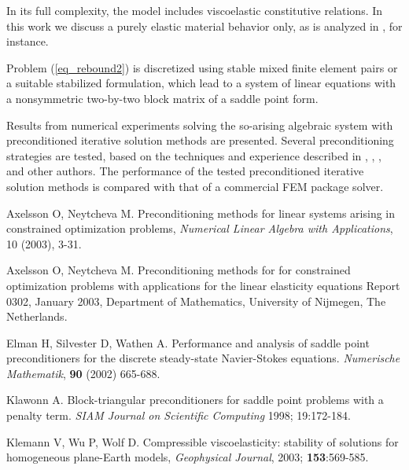 \documentclass{report}
\begin{document}
In its full complexity, the model includes viscoelastic constitutive
relations. In this work we discuss a purely elastic material behavior
only, as is analyzed in \cite{KlemannWuWolf}, for instance.

Problem (\ref{eq_rebound2}) is discretized using stable mixed finite
element pairs or a suitable stabilized formulation,
which lead to a system of linear equations with a nonsymmetric
two-by-two block matrix of a saddle point form.

Results from numerical experiments solving the so-arising algebraic
system with preconditioned iterative solution methods are presented.
Several preconditioning strategies are tested, based on the techniques
and experience described in \cite{Klawonn}, \cite{elman},
\cite{AxelssonNeytcheva}, \cite{AxelssonNeytcheva1} and other authors.
The performance of the tested preconditioned iterative solution methods
is compared with that of a commercial FEM package solver.

\begin{thebibliography}{ABC}
Axelsson O, Neytcheva M.
Preconditioning methods for linear systems arising in constrained optimization problems,
{\em Numerical Linear Algebra with Applications}, 10 (2003), 3-31.

Axelsson O, Neytcheva M.
Preconditioning methods for for constrained optimization problems with
applications for the linear elasticity equations
Report 0302, January 2003, Department of Mathematics,
University of Nijmegen, The Netherlands.

Elman H, Silvester D, Wathen A. Performance and analysis of saddle point
preconditioners for the discrete steady-state Navier-Stokes equations.
\textit{Numerische Mathematik}, {\bf 90} (2002) 665-688.

 Klawonn A. Block-triangular preconditioners for saddle
point problems with a penalty term. {\em SIAM Journal on Scientific
Computing} 1998;
19:172-184.

Klemann V, Wu P, Wolf D. Compressible viscoelasticity: stability of
solutions for homogeneous plane-Earth models,
\textit{Geophysical Journal}, 2003; \textbf{153}:569-585.


\end{thebibliography}
\end{document}

